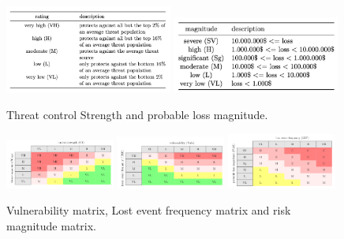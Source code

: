 \documentclass[12pt]{article}
\begin{document}
\begin{figure}[h]
    \centering
    \includegraphics[width=0.49\textwidth]{Figures/Risk Assesment/Threat_Control_Str.png}
    \includegraphics[width=0.49\textwidth]{Figures/Risk Assesment/Threat_Loss.png}
    \caption{Threat control Strength and probable loss magnitude.}
\end{figure}


\begin{figure}[h]
    \centering
    \includegraphics[width=0.32\textwidth]{Figures/Risk Assesment/Threat_vunl_mat.png}
    \includegraphics[width=0.32\textwidth]{Figures/Risk Assesment/Threats_loss_mat.png}
    \includegraphics[width=0.32\textwidth]{Figures/Risk Assesment/Threat_risk_mat.png}
    \caption{Vulnerability matrix, Lost event frequency matrix and risk magnitude matrix.}
\end{figure}

\newpage
\end{document}
